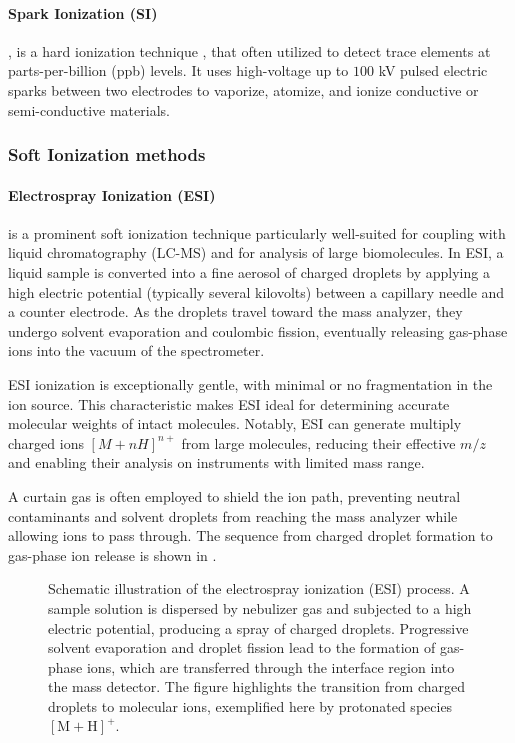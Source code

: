 \paragraph{Spark Ionization (SI)}, is a hard ionization technique \cite[p.~1]{Lin2024}, that often utilized to detect trace elements at parts-per-billion (ppb) levels. \cite[p.~428]{Ganeev2016}
It uses high-voltage up to  $100$ kV pulsed electric sparks between two electrodes to vaporize, atomize, and ionize conductive or semi-conductive materials. \cite[p.~428]{Ganeev2016}

\subsubsection{Soft Ionization methods}

\paragraph{Electrospray Ionization (ESI)} is a prominent soft ionization technique particularly well-suited for coupling with liquid chromatography (LC-MS) and for analysis of large biomolecules. \cite{Fenn1989}
In ESI, a liquid sample is converted into a fine aerosol of charged droplets by applying a high electric potential (typically several kilovolts) between a capillary needle and a counter electrode. \cite[p.~3]{Banerjee2012}
As the droplets travel toward the mass analyzer, they undergo solvent evaporation and coulombic fission, eventually releasing gas-phase ions into the vacuum of the spectrometer. \cite[p.~7]{Banerjee2012} \cite[p.~53]{Dass2007}

ESI ionization is exceptionally gentle, with minimal or no fragmentation in the ion source. \cite[p.~7]{Banerjee2012} 
This characteristic makes ESI ideal for determining accurate molecular weights of intact molecules. \cite[p.~50]{Dass2007}
Notably, ESI can generate multiply charged ions $[M+nH]^{n+}$ from large molecules, reducing their effective $m/z$ and enabling their analysis on instruments with limited mass range. \cite[p.~50]{Dass2007}

A curtain gas is often employed to shield the ion path, preventing neutral contaminants and solvent droplets from reaching the mass analyzer while allowing ions to pass through. \cite[p.~42]{Hoffmann2011}
The sequence from charged droplet formation to gas-phase ion release is shown in .


\begin{figure}[H]
    \centering
    
    \caption[Schematic of ESI ionization]{
        Schematic illustration of the electrospray ionization (ESI) process. 
        A sample solution is dispersed by nebulizer gas and subjected to a high electric potential, producing a spray of charged droplets. 
        Progressive solvent evaporation and droplet fission lead to the formation of gas-phase ions, which are transferred through the interface region into the mass detector. 
        The figure highlights the transition from charged droplets to molecular ions, exemplified here by protonated species \([\mathrm{M+H}]^{+}\).
    }
    \label{fig:esi-schematic}
    \cite[p.39]{Rockwood2018}
\end{figure}

